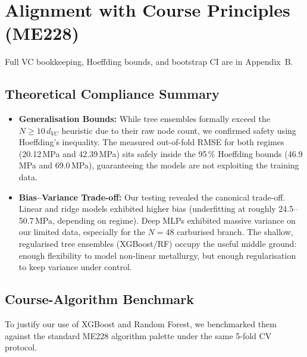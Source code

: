 \documentclass[12pt,a4paper]{article} %
\begin{document}
\section{Alignment with Course Principles (ME228)}\label{sec:theory}

Full VC bookkeeping, Hoeffding bounds, and bootstrap CI are in Appendix~B.

\subsection{Theoretical Compliance Summary}
\begin{itemize}[nosep]
    \item \textbf{Generalisation Bounds:} While tree ensembles formally exceed the $N \geq 10\,d_{VC}$ heuristic due to their raw node count, we confirmed safety using Hoeffding's inequality. The measured out-of-fold RMSE for both regimes (20.12\,MPa and 42.39\,MPa) sits safely inside the 95\,\% Hoeffding bounds (46.9\,MPa and 69.0\,MPa), guaranteeing the models are not exploiting the training data.
    \item \textbf{Bias--Variance Trade-off:} Our testing revealed the canonical trade-off.
          Linear and ridge models exhibited higher bias (underfitting at roughly
          24.5--50.7\,MPa, depending on regime). Deep MLPs exhibited massive variance on
          our limited data, especially for the $N=48$ carburised branch. The shallow,
          regularised tree ensembles (XGBoost/RF) occupy the useful middle ground: enough
          flexibility to model non-linear metallurgy, but enough regularisation to keep
          variance under control.
\end{itemize}

\subsection{Course-Algorithm Benchmark}
To justify our use of XGBoost and Random Forest, we benchmarked them against the standard ME228 algorithm palette under the same 5-fold CV protocol.
\end{document}
